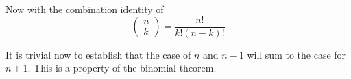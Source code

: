 \documentclass[]{amsart}
\begin{document}
Now with the combination identity of
\begin{equation}
    \left(\begin{array}{c} n \\ k \end{array} \right) = \frac{n!}{k!(n-k)!}
\end{equation}



It is trivial now to establish that the case of $n$ and $n-1$ will sum to the case for $n+1$.
This is a property of the binomial theorem.
\end{document}
